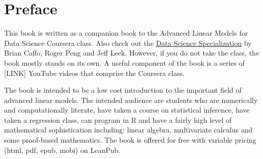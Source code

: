 \chapter{Preface}

This book is written as a companion book to the
Advanced Linear Models for Data Science
Coursera class. Also check out the \href{https://www.coursera.org/specialization/jhudatascience/1}{Data Science Specialization} by Brian Caffo, Roger Peng and Jeff Leek. However, if you do not take the class, the book mostly stands on its own. A
useful component of the book is a series of [LINK] YouTube videos that comprise the
Coursera class.

The book is intended to be a low cost introduction to the important field of
advanced linear models. The intended audience are students who are numerically
and computationally literate, have taken a
course on statistical inference, have taken a regression class, can program in R
and have a fairly high level of mathematical sophistication including: linear algebra,
multivariate calculus and some proof-based mathematics.
The book is offered for free with variable pricing (html, pdf, epub, mobi) on
LeanPub.


